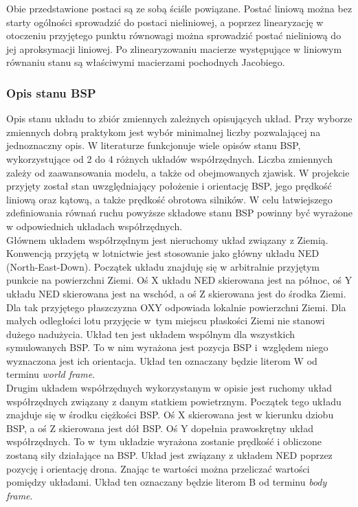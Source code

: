 Obie przedstawione postaci są ze sobą ściśle powiązane. Postać liniową można bez starty ogólności sprowadzić do postaci nieliniowej, a poprzez linearyzację w otoczeniu przyjętego punktu równowagi można sprowadzić postać nieliniową do jej aproksymacji liniowej. Po zlinearyzowaniu macierze występujące w liniowym równaniu stanu są właściwymi macierzami pochodnych Jacobiego.

\subsubsection{Opis stanu BSP}

Opis stanu układu to zbiór zmiennych zależnych opisujących układ. Przy wyborze zmiennych dobrą praktykom jest wybór minimalnej liczby pozwalającej na jednoznaczny opis. W literaturze funkcjonuje wiele opisów stanu BSP, wykorzystujące od 2 do 4 różnych układów współrzędnych. Liczba zmiennych zależy od zaawansowania modelu, a także od obejmowanych zjawisk. W projekcie przyjęty został stan uwzględniający położenie i orientację BSP, jego prędkość liniową oraz kątową, a także prędkość obrotowa silników. W celu łatwiejszego zdefiniowania równań ruchu powyższe składowe stanu BSP powinny być wyrażone w odpowiednich układach współrzędnych.\\

Głównem układem współrzędnym jest nieruchomy układ związany z Ziemią. Konwencją przyjętą w lotnictwie jest stosowanie jako główny układu NED (North-East-Down). Początek układu znajduję się w arbitralnie przyjętym punkcie na powierzchni Ziemi. Oś X układu NED skierowana jest na północ, oś Y układu NED skierowana jest na wschód, a oś Z skierowana jest do środka Ziemi. Dla tak przyjętego płaszczyzna OXY odpowiada lokalnie powierzchni Ziemi. Dla małych odległości lotu przyjęcie w~tym miejscu płaskości Ziemi nie stanowi dużego nadużycia. Układ ten jest układem wspólnym dla wszystkich symulowanych BSP. To w nim wyrażona jest pozycja BSP i~względem niego wyznaczona jest ich orientacja. Układ ten oznaczany będzie literom W od terminu \textit{world frame}.\\

Drugim układem współrzędnych wykorzystanym w opisie jest ruchomy układ współrzędnych związany z danym statkiem powietrznym. Początek tego układu znajduje się w środku ciężkości BSP. Oś X skierowana jest w kierunku dziobu BSP, a oś Z skierowana jest dół BSP. Oś Y dopełnia prawoskrętny układ współrzędnych. To w~tym układzie wyrażona zostanie prędkość i obliczone zostaną siły działające na BSP. Układ jest związany z układem NED poprzez pozycję i orientację drona. Znając te wartości można przeliczać wartości pomiędzy układami.  Układ ten oznaczany będzie literom B od terminu \textit{body frame}.

